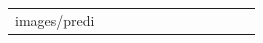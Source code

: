 \documentclass[conference]{IEEEtran}
\begin{document}
\begin{figure}
\begin{center}
\begin{tabular}{| x{1.11cm} | x{.75cm} | x{.75cm} || x{1.11cm} | x{.75cm} | x{.75cm} || x{1.11cm} | x{.75cm} | x{.75cm} || x{1.11cm} | x{.75cm} | x{.75cm} |}
images/predi
\end{tabular}
\end{center}
\end{figure}
\end{document}
